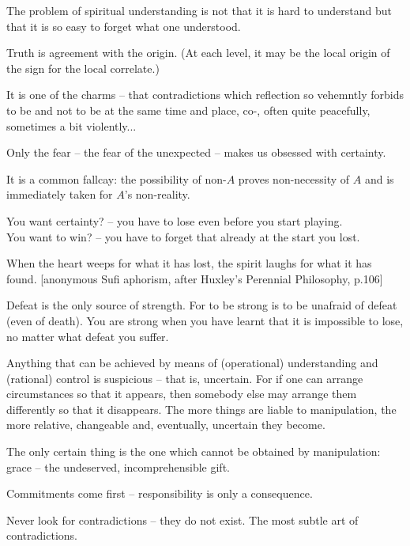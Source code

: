 \pa
The problem of spiritual understanding is not that it is hard to understand
but that it is so easy to forget what one understood.

\pa 
Truth is agreement with the origin. (At each level, it may be the local 
origin of the sign for the local correlate.)

\pa
It is one of the charms -- that contradictions which reflection so vehemntly
forbids to be and not to be at the same time and place, co-, often
quite peacefully, sometimes a bit violently...


\pa
Only the fear -- the fear of the unexpected -- makes us obsessed with certainty.

\pa 
It is a common fallcay: the possibility of non-$A$ proves non-necessity of $A$ and
is immediately taken for $A$'s non-reality.

\pa
You want certainty? -- you have to lose even before you start playing.\\
You want to win? -- you have to forget that already at the start you lost.

When the heart weeps for what it has lost, the spirit laughs for what it has
found. [anonymous Sufi aphorism, after Huxley's Perennial Philosophy, p.106]

\pa
Defeat is the only source of strength. For to be strong is to be unafraid of
defeat (even of death). You are strong when you have learnt that it is
impossible to lose, no matter what defeat you suffer. 

\pa 
Anything that can be achieved by means of (operational)
understanding and (rational) control is suspicious -- that is,
uncertain.  For if one can arrange circumstances so that it appears,
then somebody else may arrange them differently so that it disappears. 
The more things are liable to manipulation, the more relative, 
changeable and, eventually, uncertain they become.

The only certain thing is the one which cannot be obtained by manipulation: grace --
the undeserved, incomprehensible gift.

\pa
Commitments come first -- responsibility is only a consequence.


\pa
Never look for contradictions -- they do not exist.
\pa
The most subtle art of contradictions.


